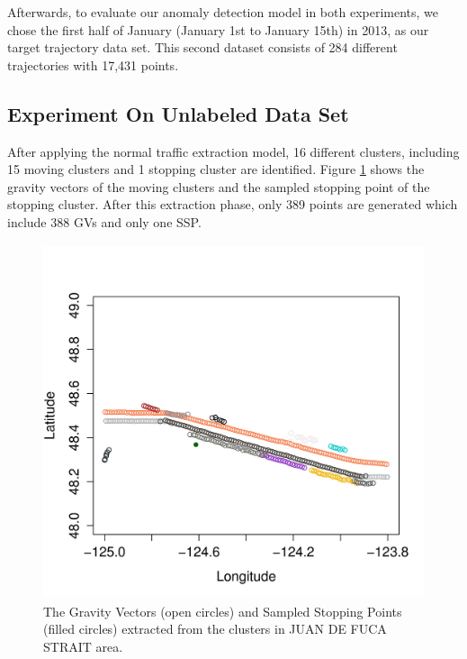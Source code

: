 \documentclass[12pt,glossary]{dalcsthesis}
\begin{document}
Afterwards, to evaluate our anomaly detection model in  both experiments, we chose the first half of January (January 1st to January 15th) in 2013, as our target trajectory data set. This second dataset consists of 284 different trajectories with 17,431 points. 


\subsection{Experiment On Unlabeled Data Set}
\label{sec:exp_2.1}

After applying the normal traffic extraction model, 16 different clusters, including 15 moving clusters and 1 stopping cluster are identified. %
Figure \ref{fig:jdfk_gv2} shows the gravity vectors of the moving clusters and the sampled stopping point of the stopping cluster. After this extraction phase, only 389 points are generated which include 388 GVs and only one SSP. %

\begin{figure}[!htb]
\centering
\includegraphics[width=5in,height=4.1in]{jdfk_clusters_new.jpg}
\caption{The Gravity Vectors (open circles) and Sampled Stopping Points (filled circles) extracted from the clusters in JUAN DE FUCA STRAIT area.}
\label{fig:jdfk_gv2}
\end{figure}
\end{document}
